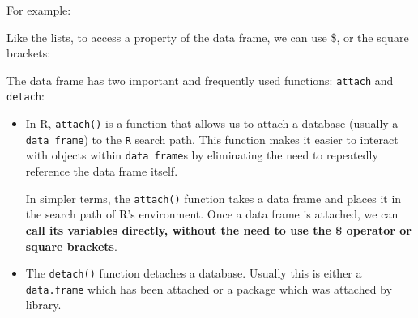 \documentclass[a4paper]{article}
\newcommand{\highspace}{\vspace{1.2em}\noindent}
\begin{document}
    \highspace
    For example:
    
    Like the lists, to access a property of the data frame, we can use \$, or the square brackets:
    
    The data frame has two important and frequently used functions: \texttt{attach} and \texttt{detach}:
    \begin{itemize}
        \item In R, \texttt{attach()} is a function that allows us to attach a database (usually a \texttt{data frame}) to the \texttt{R} search path. This function makes it easier to interact with objects within \texttt{data frame}s by eliminating the need to repeatedly reference the data frame itself.

        In simpler terms, the \texttt{attach()} function takes a data frame and places it in the search path of R's environment. Once a data frame is attached, we can \textbf{call its variables directly, without the need to use the \$ operator or square brackets}.
        

        \item The \texttt{detach()} function detaches a database. Usually this is either a \texttt{data.frame} which has been attached or a package which was attached by library.
        
    \end{itemize}

    






















    \newpage

    {}
    

    \newpage

    \printindex
\end{document}
